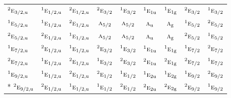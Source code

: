 \documentclass[10pt,a4paper]{article}
\numberwithin{equation}{section}
\newcommand{\irr}[1]{\text{\normalfont\scshape #1}}
\newcommand{\conjpair}[1]{{}^{#1}}
\newcommand{\ptag}[1]{\mathrm{#1}}
\begin{document}
{\begin{longtable}{@{}lcccccccc@{}}
$\conjpair{2}\irr{e}_{3/2,\ptag{u}}$ & $\conjpair{1}\irr{e}_{1/2,\ptag{u}}$ & $\conjpair{2}\irr{e}_{1/2,\ptag{u}}$ & $\conjpair{2}\irr{e}_{3/2}$ & $\conjpair{1}\irr{e}_{3/2}$ & $\conjpair{1}\irr{e}_{1\ptag{u}}$ & $\conjpair{1}\irr{e}_{1\ptag{g}}$ & $\conjpair{2}\irr{e}_{3/2}$ & $\conjpair{1}\irr{e}_{3/2}$\\
$\conjpair{1}\irr{e}_{5/2,\ptag{u}}$ & $\conjpair{1}\irr{e}_{1/2,\ptag{u}}$ & $\conjpair{2}\irr{e}_{1/2,\ptag{u}}$ & $\irr{a}_{5/2}$ & $\irr{a}_{5/2}$ & $\irr{a}_{\ptag{u}}$ & $\irr{a}_{\ptag{g}}$ & $\conjpair{1}\irr{e}_{5/2}$ & $\conjpair{2}\irr{e}_{5/2}$\\
$\conjpair{2}\irr{e}_{5/2,\ptag{u}}$ & $\conjpair{2}\irr{e}_{1/2,\ptag{u}}$ & $\conjpair{1}\irr{e}_{1/2,\ptag{u}}$ & $\irr{a}_{5/2}$ & $\irr{a}_{5/2}$ & $\irr{a}_{\ptag{u}}$ & $\irr{a}_{\ptag{g}}$ & $\conjpair{2}\irr{e}_{5/2}$ & $\conjpair{1}\irr{e}_{5/2}$\\
$\conjpair{1}\irr{e}_{7/2,\ptag{u}}$ & $\conjpair{2}\irr{e}_{1/2,\ptag{u}}$ & $\conjpair{1}\irr{e}_{1/2,\ptag{u}}$ & $\conjpair{2}\irr{e}_{3/2}$ & $\conjpair{1}\irr{e}_{3/2}$ & $\conjpair{1}\irr{e}_{1\ptag{u}}$ & $\conjpair{1}\irr{e}_{1\ptag{g}}$ & $\conjpair{1}\irr{e}_{7/2}$ & $\conjpair{2}\irr{e}_{7/2}$\\
$\conjpair{2}\irr{e}_{7/2,\ptag{u}}$ & $\conjpair{1}\irr{e}_{1/2,\ptag{u}}$ & $\conjpair{2}\irr{e}_{1/2,\ptag{u}}$ & $\conjpair{1}\irr{e}_{3/2}$ & $\conjpair{2}\irr{e}_{3/2}$ & $\conjpair{2}\irr{e}_{1\ptag{u}}$ & $\conjpair{2}\irr{e}_{1\ptag{g}}$ & $\conjpair{2}\irr{e}_{7/2}$ & $\conjpair{1}\irr{e}_{7/2}$\\
$\conjpair{1}\irr{e}_{9/2,\ptag{u}}$ & $\conjpair{1}\irr{e}_{1/2,\ptag{u}}$ & $\conjpair{2}\irr{e}_{1/2,\ptag{u}}$ & $\conjpair{2}\irr{e}_{1/2}$ & $\conjpair{1}\irr{e}_{1/2}$ & $\conjpair{1}\irr{e}_{2\ptag{u}}$ & $\conjpair{1}\irr{e}_{2\ptag{g}}$ & $\conjpair{1}\irr{e}_{9/2}$ & $\conjpair{2}\irr{e}_{9/2}$\\*
$\conjpair{2}\irr{e}_{9/2,\ptag{u}}$ & $\conjpair{2}\irr{e}_{1/2,\ptag{u}}$ & $\conjpair{1}\irr{e}_{1/2,\ptag{u}}$ & $\conjpair{1}\irr{e}_{1/2}$ & $\conjpair{2}\irr{e}_{1/2}$ & $\conjpair{2}\irr{e}_{2\ptag{u}}$ & $\conjpair{2}\irr{e}_{2\ptag{g}}$ & $\conjpair{2}\irr{e}_{9/2}$ & $\conjpair{1}\irr{e}_{9/2}$\\
\bottomrule\end{longtable}}
\end{document}
